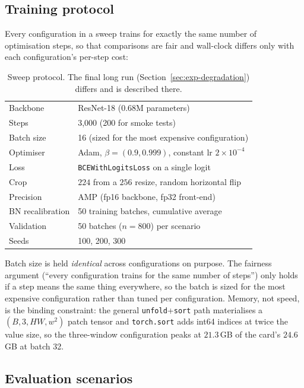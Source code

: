 \subsection{Training protocol}

Every configuration in a sweep trains for exactly the same number of
optimisation steps, so that comparisons are fair and wall-clock differs only
with each configuration's per-step cost:

\begin{table}[h]
  \centering
  \caption{Sweep protocol. The final long run
  (Section~\ref{sec:exp-degradation}) differs and is described there.}
  \label{tab:protocol}
  \begin{tabular}{ll}
    \toprule
    Backbone        & ResNet-18 (0.68M parameters) \\
    Steps           & 3{,}000 (200 for smoke tests) \\
    Batch size      & 16 (sized for the most expensive configuration) \\
    Optimiser       & Adam, $\beta = (0.9, 0.999)$, constant lr $2\times10^{-4}$ \\
    Loss            & \texttt{BCEWithLogitsLoss} on a single logit \\
    Crop            & $224$ from a $256$ resize, random horizontal flip \\
    Precision       & AMP (fp16 backbone, fp32 front-end) \\
    BN recalibration& 50 training batches, cumulative average \\
    Validation      & 50 batches ($n=800$) per scenario \\
    Seeds           & 100, 200, 300 \\
    \bottomrule
  \end{tabular}
\end{table}

Batch size is held \emph{identical} across configurations on purpose. The
fairness argument (``every configuration trains for the same number of steps'')
only holds if a step means the same thing everywhere, so the batch is sized for
the most expensive configuration rather than tuned per configuration. Memory,
not speed, is the binding constraint: the general \texttt{unfold}+\texttt{sort}
path materialises a $(B, 3, HW, w^2)$ patch tensor and \texttt{torch.sort} adds
int64 indices at twice the value size, so the three-window configuration peaks
at $21.3$\,GB of the card's $24.6$\,GB at batch 32.

\subsection{Evaluation scenarios}

